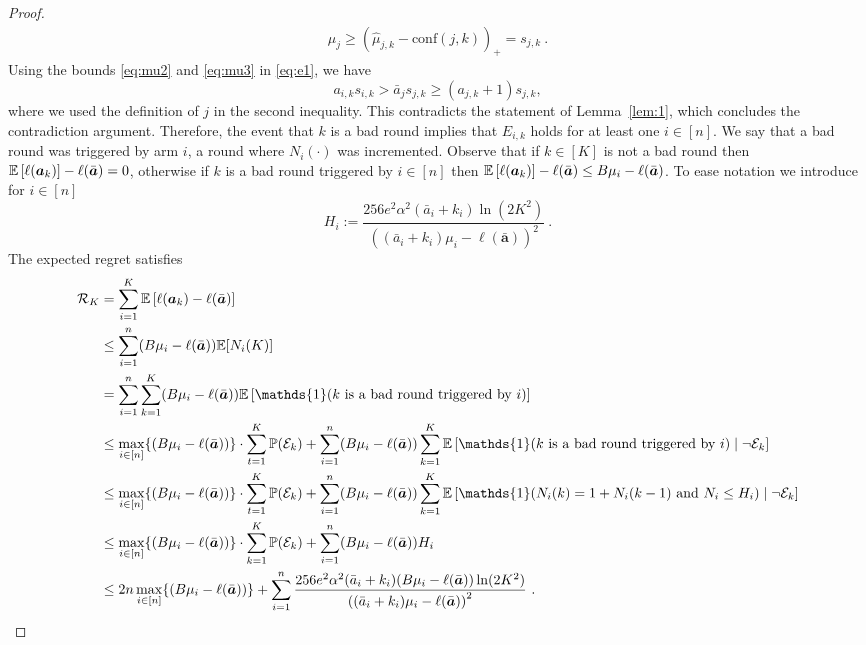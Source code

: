 \begin{proof}
\begin{align}
		\mu_j %
		\ge \left(\hat{\mu}_{j,k} - \text{conf}(j,k)\right)_{+}
		= s_{j,k}~.\label{eq:mu3}
	\end{align}
	Using the bounds \eqref{eq:mu2} and \eqref{eq:mu3} in \eqref{eq:e1}, we have
	$$
	a_{i,k} s_{i,k} > \bar{a}_j s_{j,k} \ge (a_{j,k}+1) s_{j,k},
	$$
	where we used the definition of $j$ in the second inequality.
	This contradicts the statement of Lemma~\ref{lem:1}, which concludes the contradiction argument. Therefore, the event that $k$ is a bad round implies that $E_{i,k}$ holds for at least one $i\in [n]$.
	We say that a bad round was triggered by arm $i$, a round where $N_i(\cdot)$ was incremented. 
	Observe that if $k \in [K]$ is not a bad round then $\mathbb{E}\left[\ell(\bm{a}_k)\right]-\ell(\bar{\bm{a}})=0$, otherwise if $k$ is a bad round triggered by $i \in [n]$ then $\mathbb{E}\left[\ell(\bm{a}_{k})\right]-\ell(\bar{\bm{a}}) \le B\mu_i-\ell(\bar{\bm{a}})$.
	To ease notation we introduce for $i\in [n]$
	$$
	H_i := \frac{256e^2\alpha^2 (\bar{a}_i+k_i) \ln(2K^2)}{\left((\bar{a}_i+k_i)\mu_i - \ell(\bar{\bm{a}})\right)^2}~.
	$$
	The expected regret satisfies
	\begin{align*}
		\mathcal{R}_K &= \sum_{i=1}^{K} \mathbb{E}\left[\ell(\bm{a}_k)-\ell(\bar{\bm{a}})\right]\\
		&\le \sum_{i=1}^{n} (B\mu_i-\ell(\bar{\bm{a}}))\mathbb{E}[N_i(K)]\\ 
		&= \sum_{i=1}^{n}\sum_{k=1}^{K} (B\mu_i-\ell(\bar{\bm{a}}))\mathbb{E}\left[\mathds{1}(k \text{ is a bad round triggered by }i)\right]\\
		&\le \max_{i\in [n]}\{(B\mu_i-\ell(\bar{\bm{a}}))\}\cdot\sum_{t=1}^{K} \mathbb{P}(\mathcal{E}_k)+ \sum_{i=1}^{n}(B\mu_i-\ell(\bar{\bm{a}}))\sum_{k=1}^{K} \mathbb{E}\left[\mathds{1}(k \text{ is a bad round triggered by }i) \mid \neg \mathcal{E}_k\right]\\
		&\le \max_{i\in [n]}\{(B\mu_i-\ell(\bar{\bm{a}}))\}\cdot\sum_{t=1}^{K} \mathbb{P}(\mathcal{E}_k)+ \sum_{i=1}^{n}(B\mu_i-\ell(\bar{\bm{a}}))\sum_{k=1}^{K} \mathbb{E}\left[\mathds{1}(N_i(k)=1+N_i(k-1) \text{ and } N_i \le H_i ) \mid \neg \mathcal{E}_k\right]\\
		&\le \max_{i\in [n]}\{(B\mu_i-\ell(\bar{\bm{a}}))\}\cdot\sum_{k=1}^{K} \mathbb{P}(\mathcal{E}_k)+ \sum_{i=1}^{n} (B\mu_i-\ell(\bar{\bm{a}}))H_i\\
		&\le 2n \max_{i\in [n]}\{(B\mu_i-\ell(\bar{\bm{a}}))\}+  \sum_{i=1}^{n} \frac{256e^2\alpha^2 (\bar{a}_i+k_i)(B\mu_i-\ell(\bar{\bm{a}})) \ln(2K^2)}{\left((\bar{a}_i+k_i)\mu_i - \ell(\bar{\bm{a}})\right)^2}~. \qedhere
	\end{align*}
\end{proof}


